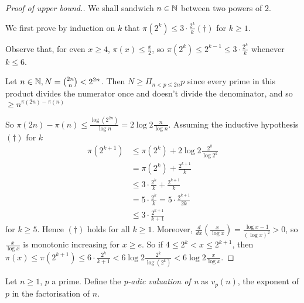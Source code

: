 \documentclass[10pt,a4paper]{article}
\begin{document}
\begin{proof}[Proof of upper bound.]
We shall sandwich $n \in \mathbb{N}$ between two powers of $2$.

We first prove by induction on $k$ that $\pi(2^k) \leq 3\cdot\frac{2^k}{k} (\dagger)$ for $k \geq 1$.

Observe that, for even $x \geq 4$, $\pi(x) \leq \frac{x}{2}$, so $\pi(2^k) \leq 2^{k-1} \leq 3\cdot \frac{2^k}{k}$ whenever $k \leq 6$.

Let $n \in \mathbb{N}, N = \binom{2n}{n} < 2^{2n}$. Then $N \geq \Pi_{n<p\leq 2n}p$ since every prime in this product divides the numerator once and doesn't divide the denominator, and so $\geq n^{\pi(2n)-\pi(n)}$

So $\pi(2n)-\pi(n) \leq \frac{\log(2^{2n})}{\log n} = 2\log 2\frac{n}{\log n}$. Assuming the inductive hypothesis $(\dagger)$ for $k$
\begin{align*}
\pi(2^{k+1}) &\leq \pi(2^k) + 2\log 2 \frac{2^k}{\log 2^k}\\
&= \pi(2^k) + \frac{2^{k+1}}{k}\\
&\leq 3 \cdot \frac{2^k}{k} + \frac{2^{k+1}}{k}\\
&= 5 \cdot \frac{2^k}{k} = 5\cdot \frac{2^{k+1}}{2k}\\
&\leq 3\cdot \frac{2^{k+1}}{k+1}
\end{align*}
for $k \geq 5$. Hence $(\dagger)$ holds for all $k\geq 1$. Moreover, $\frac{d}{dx}\left(\frac{x}{\log x}\right) = \frac{\log x - 1}{(\log x)^2} > 0$, so $\frac{x}{\log x}$ is monotonic increasing for $x \geq e$. So if $4 \leq 2^k < x \leq 2^{k+1}$, then $\pi(x) \leq \pi(2^{k+1}) \leq 6\cdot \frac{2^k}{k+1} < 6 \log 2 \frac{2^k}{\log(2^k)} < 6\log 2 \frac{x}{\log x}$.
\end{proof}
Let $n \geq 1$, $p$ a prime. Define the \emph{p-adic valuation of n} as $v_p(n)$, the exponent of $p$ in the factorisation of $n$.
\end{document}
